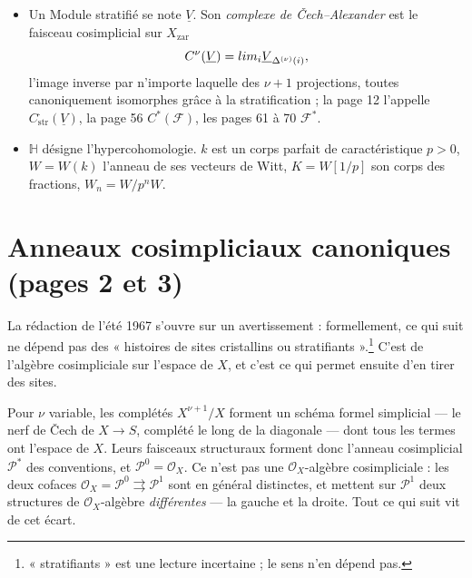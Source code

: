 \documentclass[11pt,a4paper]{article}
\begin{document}
\begin{itemize}
{  infinitésimal, et « cristallin » est réservé au site à puissances
  divisées. Le nom ne change rien en caractéristique nulle, où les deux sites
  ont même cohomologie ; il change tout en caractéristique $p$, et c'est
  justement l'échec constaté à la page 16.} Le \emph{site stratifiant}
  $(X/S)_{\mathrm{strat}}$ est le sous-site formé des épaississements
  $U \hookrightarrow T$ pour lesquels l'inclusion de $U$ dans $X$ se
  prolonge, au moins localement, en un $S$-morphisme $T \to
  X$.\footnote{Le dossier ne donne pas la définition par écrit : la page 54
  l'annonce (« Définition du site et du topos stratifiant ») et la page 59
  invoque « la restriction sur ces objets du site stratifiant parmi ceux du
  site cristallin ». Nous la restituons sous la forme qui rend vraies les
  assertions des pages 53, 54 et 59 : avec elle, la donnée d'un Module sur
  ce site, à flèches de transition des isomorphismes, est une stratification,
  et le faisceau $\widetilde{X}$ représenté par $X$ lui-même couvre l'objet
final.}
\item Un Module stratifié se note $\underline{V}$. Son \emph{complexe de
  Čech--Alexander} est le faisceau cosimplicial sur $X_{\mathrm{zar}}$
  \[
    C^{\nu}(\underline{V}) = \varprojlim_{i} \underline{V}_{\Delta^{(\nu)}(i)} ,
  \]
  l'image inverse par n'importe laquelle des $\nu+1$ projections, toutes
  canoniquement isomorphes grâce à la stratification ; la page 12 l'appelle
  $C^{\cdot}_{\mathrm{str}}(\underline{V})$, la page 56
  $C^{*}(\mathcal{F})$, les pages 61 à 70 $\mathcal{F}^{*}$.
\item $\mathbb{H}$ désigne l'hypercohomologie. $k$ est un corps parfait de
  caractéristique $p > 0$, $W = W(k)$ l'anneau de ses vecteurs de Witt,
  $K = W[1/p]$ son corps des fractions, $W_n = W/p^{n}W$.
\end{itemize}

\section*{Anneaux cosimpliciaux canoniques (pages 2 et 3)}

La rédaction de l'été 1967 s'ouvre sur un avertissement : formellement, ce
qui suit ne dépend pas des « histoires de sites cristallins ou
stratifiants ».\footnote{« stratifiants » est une lecture incertaine ; le
sens n'en dépend pas.} C'est de l'algèbre cosimpliciale sur l'espace de $X$,
et c'est ce qui permet ensuite d'en tirer des sites.

Pour $\nu$ variable, les complétés $X^{\nu+1}/X$ forment un schéma formel
simplicial — le nerf de Čech de $X \to S$, complété le long de la diagonale
— dont tous les termes ont l'espace de $X$. Leurs faisceaux structuraux
forment donc l'anneau cosimplicial $\mathcal{P}^{*}$ des conventions, et
$\mathcal{P}^{0} = \mathcal{O}_X$. Ce n'est pas une $\mathcal{O}_X$-algèbre
cosimpliciale : les deux cofaces $\mathcal{O}_X = \mathcal{P}^{0}
\rightrightarrows \mathcal{P}^{1}$ sont en général distinctes, et mettent sur
$\mathcal{P}^{1}$ deux structures de $\mathcal{O}_X$-algèbre
\emph{différentes} — la gauche et la droite. Tout ce qui suit vit de cet
écart.
\end{document}
